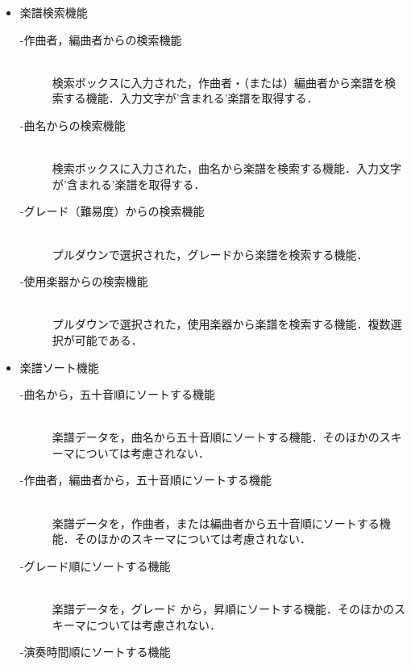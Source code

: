 \begin{itemize}
    \item 楽譜検索機能
          \begin{description}
              \item[-作曲者，編曲者からの検索機能]\mbox{}\\
              検索ボックスに入力された，作曲者・（または）編曲者から楽譜を検索する機能．入力文字が'含まれる'楽譜を取得する．
              \item[-曲名からの検索機能] \mbox{}\\
                  検索ボックスに入力された，曲名から楽譜を検索する機能．入力文字が'含まれる'楽譜を取得する．
              \item[-グレード（難易度）からの検索機能] \mbox{}\\
                  プルダウンで選択された，グレードから楽譜を検索する機能．
              \item[-使用楽器からの検索機能] \mbox{}\\
                  プルダウンで選択された，使用楽器から楽譜を検索する機能．複数選択が可能である．
          \end{description}
    \item 楽譜ソート機能
          \begin{description}
              \item[-曲名から，五十音順にソートする機能]\mbox{}\\
              楽譜データを，曲名から五十音順にソートする機能．そのほかのスキーマについては考慮されない．
              \item[-作曲者，編曲者から，五十音順にソートする機能] \mbox{}\\
                  楽譜データを，作曲者，または編曲者から五十音順にソートする機能．そのほかのスキーマについては考慮されない．
              \item[-グレード順にソートする機能] \mbox{}\\
                  楽譜データを，グレード
                  から，昇順にソートする機能．そのほかのスキーマについては考慮されない．
              \item[-演奏時間順にソートする機能] \mbox{}\\

\end{description}
\end{itemize}
